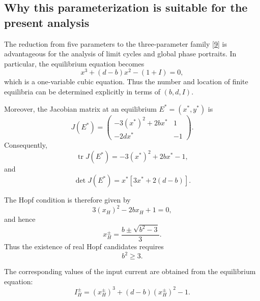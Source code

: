 \documentclass[11pt,a4paper]{article}
\begin{document}
\subsection{Why this parameterization is suitable for the present
analysis}

The reduction from five parameters to the three-parameter family
\eqref{9} is advantageous for the analysis of limit cycles and global
phase portraits. In particular, the equilibrium equation becomes
\begin{equation}
\boxed{
x^3+(d-b)x^2-(1+I)=0,
}
\tag{10}
\end{equation}
which is a one-variable cubic equation. Thus the number and location
of finite equilibria can be determined explicitly in terms of
$(b,d,I)$.

Moreover, the Jacobian matrix at an equilibrium
$E^*=(x^*,y^*)$ is
\begin{equation}
J(E^*)
=
\begin{pmatrix}
-3(x^*)^2+2bx^* & 1\\
-2dx^* & -1
\end{pmatrix}.
\tag{11}
\end{equation}
Consequently,
\begin{equation}
\boxed{
\operatorname{tr}J(E^*)
=
-3(x^*)^2+2bx^*-1,
}
\tag{12}
\end{equation}
and
\begin{equation}
\boxed{
\det J(E^*)
=
x^*\left[3x^*+2(d-b)\right].
}
\tag{13}
\end{equation}

The Hopf condition is therefore given by
\begin{equation}
3(x_H)^2-2b x_H+1=0,
\tag{14}
\end{equation}
and hence
\begin{equation}
\boxed{
x_H^\pm
=
\frac{b\pm\sqrt{b^2-3}}{3}.
}
\tag{15}
\end{equation}
Thus the existence of real Hopf candidates requires
\begin{equation}
\boxed{
b^2\geq 3.
}
\tag{16}
\end{equation}

The corresponding values of the input current are obtained from the
equilibrium equation:
\begin{equation}
\boxed{
I_H^\pm
=
(x_H^\pm)^3
+
(d-b)(x_H^\pm)^2
-1.
}
\tag{17}
\end{equation}
\end{document}
